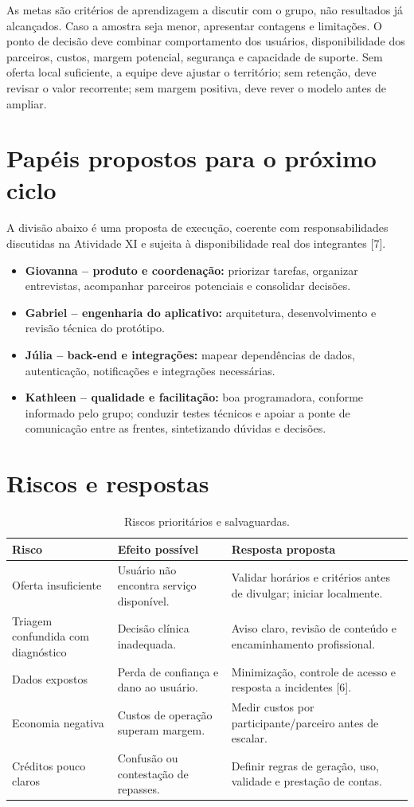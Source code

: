 \documentclass[12pt,a4paper]{article}
\begin{document}
As metas são critérios de aprendizagem a discutir com o grupo, não resultados já alcançados. Caso a amostra seja menor, apresentar contagens e limitações. O ponto de decisão deve combinar comportamento dos usuários, disponibilidade dos parceiros, custos, margem potencial, segurança e capacidade de suporte. Sem oferta local suficiente, a equipe deve ajustar o território; sem retenção, deve revisar o valor recorrente; sem margem positiva, deve rever o modelo antes de ampliar.

\section{Papéis propostos para o próximo ciclo}

A divisão abaixo é uma proposta de execução, coerente com responsabilidades discutidas na Atividade XI e sujeita à disponibilidade real dos integrantes [7].
\begin{itemize}
\item \textbf{Giovanna -- produto e coordenação:} priorizar tarefas, organizar entrevistas, acompanhar parceiros potenciais e consolidar decisões.
\item \textbf{Gabriel -- engenharia do aplicativo:} arquitetura, desenvolvimento e revisão técnica do protótipo.
\item \textbf{Júlia -- back-end e integrações:} mapear dependências de dados, autenticação, notificações e integrações necessárias.
\item \textbf{Kathleen -- qualidade e facilitação:} boa programadora, conforme informado pelo grupo; conduzir testes técnicos e apoiar a ponte de comunicação entre as frentes, sintetizando dúvidas e decisões.
\end{itemize}

\section{Riscos e respostas}

\begin{table}[htbp]\centering\small
\caption{Riscos prioritários e salvaguardas.}
\begin{tabularx}{\textwidth}{P{3.0cm}YY}
\toprule\textbf{Risco} & \textbf{Efeito possível} & \textbf{Resposta proposta}\\\midrule
Oferta insuficiente & Usuário não encontra serviço disponível. & Validar horários e critérios antes de divulgar; iniciar localmente.\\
Triagem confundida com diagnóstico & Decisão clínica inadequada. & Aviso claro, revisão de conteúdo e encaminhamento profissional.\\
Dados expostos & Perda de confiança e dano ao usuário. & Minimização, controle de acesso e resposta a incidentes [6].\\
Economia negativa & Custos de operação superam margem. & Medir custos por participante/parceiro antes de escalar.\\
Créditos pouco claros & Confusão ou contestação de repasses. & Definir regras de geração, uso, validade e prestação de contas.\\
\bottomrule\end{tabularx}\end{table}
\end{document}
